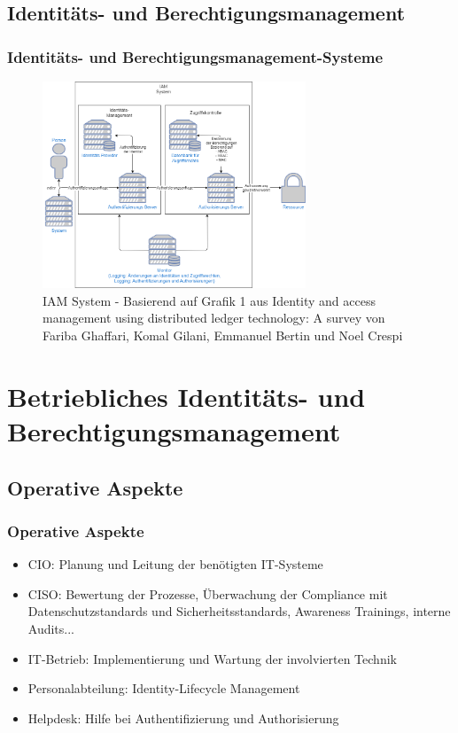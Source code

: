 \documentclass[11pt]{beamer}
\begin{document}
\subsection{Identitäts- und Berechtigungsmanagement}
\begin{frame}
  \frametitle{Identitäts- und Berechtigungsmanagement-Systeme}
  \begin{figure}[H]
    \centering
    \includegraphics[width=0.7\textwidth]{assets/accessmanagement2.png}
    \caption{IAM System - Basierend auf Grafik 1 aus \glqq{}Identity and access management using distributed ledger technology: A survey\grqq{} von Fariba Ghaffari, Komal Gilani, Emmanuel Bertin und Noel Crespi}\label{figure:iam}
  \end{figure}
\end{frame}

\section{Betriebliches Identitäts- und Berechtigungsmanagement}

\subsection{Operative Aspekte}
\begin{frame}
  \frametitle{Operative Aspekte}
  \begin{itemize}
    \item CIO: Planung und Leitung der benötigten IT-Systeme
    \item CISO: Bewertung der Prozesse, Überwachung der Compliance mit Datenschutzstandards und Sicherheitsstandards, Awareness Trainings, interne Audits...
    \item IT-Betrieb: Implementierung und Wartung der involvierten Technik
    \item Personalabteilung: Identity-Lifecycle Management
    \item Helpdesk: Hilfe bei Authentifizierung und Authorisierung
  \end{itemize}
\end{frame}
\end{document}
